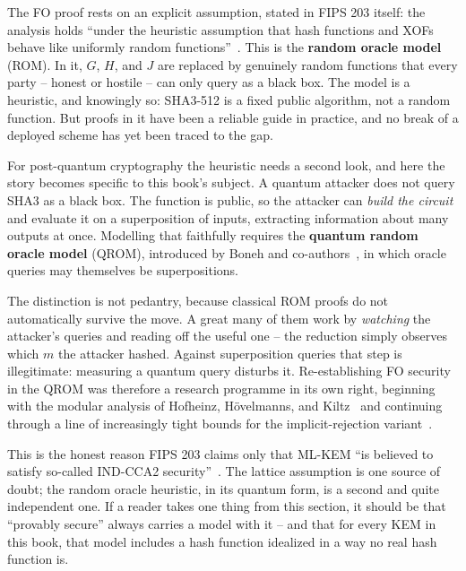 The FO proof rests on an explicit assumption, stated in FIPS 203 itself: the analysis holds ``under the heuristic assumption that
hash functions and XOFs behave like uniformly random functions''~\cite{fips203}.
This is the \textbf{random oracle model} (ROM). In it, $G$, $H$, and $J$ are
replaced by genuinely random functions that every party -- honest or hostile --
can only query as a black box. The model is a heuristic, and knowingly so:
SHA3-512 is a fixed public algorithm, not a random function. But proofs in it
have been a reliable guide in practice, and no break of a deployed scheme has
yet been traced to the gap.

For post-quantum cryptography the heuristic needs a second look, and here the
story becomes specific to this book's subject. A quantum attacker does not query
SHA3 as a black box. The function is public, so the attacker can \emph{build the
circuit} and evaluate it on a superposition of inputs, extracting information
about many outputs at once. Modelling that faithfully requires the
\textbf{quantum random oracle model} (QROM), introduced by Boneh and
co-authors~\cite{qrom2011}, in which oracle queries may themselves be
superpositions.

The distinction is not pedantry, because classical ROM proofs do not
automatically survive the move. A great many of them work by \emph{watching} the
attacker's queries and reading off the useful one -- the reduction simply
observes which $m$ the attacker hashed. Against superposition queries that step
is illegitimate: measuring a quantum query disturbs it. Re-establishing FO
security in the QROM was therefore a research programme in its own right,
beginning with the modular analysis of Hofheinz, H\"ovelmanns, and
Kiltz~\cite{hhk2017} and continuing through a line of increasingly tight bounds
for the implicit-rejection variant~\cite{sxy2018}.

This is the honest reason FIPS 203 claims only that ML-KEM ``is believed to
satisfy so-called IND-CCA2 security''~\cite{fips203}. The lattice assumption is
one source of doubt; the random oracle heuristic, in its quantum form, is a
second and quite independent one. If a reader takes one thing from this section,
it should be that ``provably secure'' always carries a model with it -- and that
for every KEM in this book, that model includes a hash function idealized in a
way no real hash function is.

